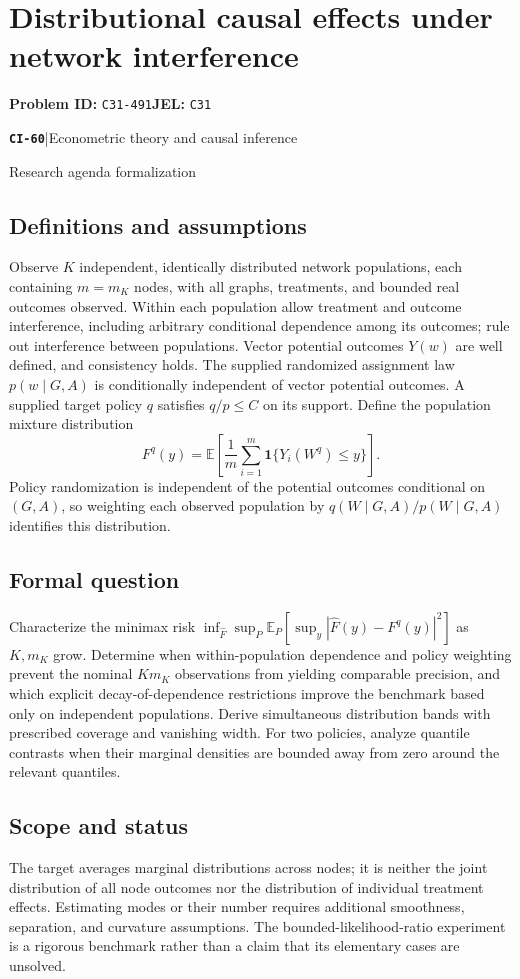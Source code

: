 \documentclass[11pt,a4paper]{article}
\newcommand{\E}{\mathbb E}
\newcommand{\ind}{\mathbf 1}
\newcommand{\entrymeta}[3]{{\sffamily\small\color{muted}\textbf{\texttt{#1}}\quad|\quad #2\par #3\par}}
\begin{document}
\section*{Distributional causal effects under network interference}
\textbf{Problem ID:} \texttt{C31-491}\quad \textbf{JEL:} \texttt{C31}\par
\label{problem:OP-0539}
\label{beyond:CI-60}
\entrymeta{CI-60}{Econometric theory and causal inference}{Research agenda formalization}
\subsection*{Definitions and assumptions}
Observe $K$ independent, identically distributed network populations, each containing $m=m_K$ nodes, with all graphs, treatments, and bounded real outcomes observed. Within each population allow treatment and outcome interference, including arbitrary conditional dependence among its outcomes; rule out interference between populations. Vector potential outcomes $Y(w)$ are well defined, and consistency holds. The supplied randomized assignment law $p(w\mid G,A)$ is conditionally independent of vector potential outcomes. A supplied target policy $q$ satisfies $q/p\leq C$ on its support. Define the population mixture distribution
\[
 F^q(y)=\E\!\left[\frac1m\sum_{i=1}^m
                   \ind\{Y_i(W^q)\leq y\}\right].
\]
Policy randomization is independent of the potential outcomes conditional on $(G,A)$, so weighting each observed population by $q(W\mid G,A)/p(W\mid G,A)$ identifies this distribution.
\subsection*{Formal question}
Characterize the minimax risk $\inf_{\widehat F}\sup_P
\E_P[\sup_y|\widehat F(y)-F^q(y)|^2]$ as $K,m_K$ grow. Determine when within-population dependence and policy weighting prevent the nominal $Km_K$ observations from yielding comparable precision, and which explicit decay-of-dependence restrictions improve the benchmark based only on independent populations. Derive simultaneous distribution bands with prescribed coverage and vanishing width. For two policies, analyze quantile contrasts when their marginal densities are bounded away from zero around the relevant quantiles.
\subsection*{Scope and status}
The target averages marginal distributions across nodes; it is neither the joint distribution of all node outcomes nor the distribution of individual treatment effects. Estimating modes or their number requires additional smoothness, separation, and curvature assumptions. The bounded-likelihood-ratio experiment is a rigorous benchmark rather than a claim that its elementary cases are unsolved.
\end{document}
